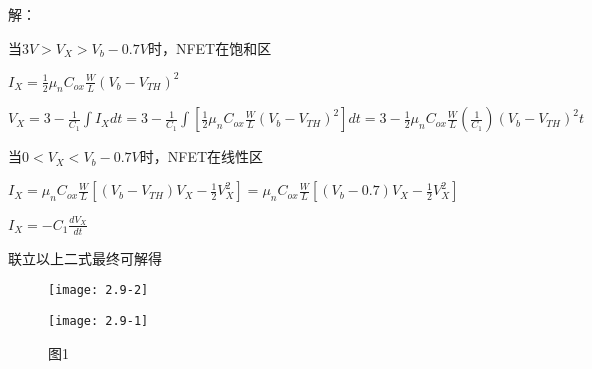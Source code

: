 


解：

\scalebox{3}{（a）}

当$3V>V_{X}>V_{b}-0.7V$时，NFET在饱和区

$I_X=\frac{1}{2}\mu_nC_{ox}\frac{W}{L}(V_{b}-V_{TH})^2$

$V_{X}=3-\frac{1}{C_1} \int I_Xdt=3-\frac{1}{C_1} \int [\frac{1}{2}\mu_nC_{ox}\frac{W}{L}(V_{b}-V_{TH})^2]dt=3-\frac{1}{2}\mu_nC_{ox}\frac{W}{L}(\frac{1}{C_1})(V_{b}-V_{TH})^2t$

当$0<V_{X}<V_{b}-0.7V$时，NFET在线性区

$I_X=\mu_nC_{ox}\frac{W}{L}[(V_{b}-V_{TH})V_{X}-\frac{1}{2}V_{X}^2]=\mu_nC_{ox}\frac{W}{L}[(V_{b}-0.7)V_{X}-\frac{1}{2}V_{X}^2]$

$I_X=-C_1\frac{dV_X}{dt}$

联立以上二式最终可解得

		\begin{figure}[H] %
	\begin{minipage}{\linewidth}
		\texttt{[image: 2.9-2]}
	\end{minipage}
\end{figure}


		\begin{figure}[H] %
	\begin{minipage}{\linewidth}
		\texttt{[image: 2.9-1]}
	\end{minipage}
	\caption*{图1} %
\end{figure}

